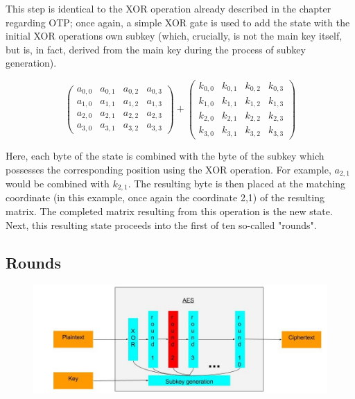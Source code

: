 \documentclass[12pt]{report}
\begin{document}
This step is identical to the XOR operation already described in the chapter regarding OTP; once again, a simple XOR gate is used to add the state with the initial XOR operations own subkey (which, crucially, is not the main key itself, but is, in fact, derived from the main key during the process of subkey generation).

\[ 
\left( \begin{array}{cccc}
a_{0,0} & a_{0,1} & a_{0,2} & a_{0,3} \\
a_{1,0} & a_{1,1} & a_{1,2} & a_{1,3} \\
a_{2,0} & a_{2,1} & a_{2,2} & a_{2,3} \\
a_{3,0} & a_{3,1} & a_{3,2} & a_{3,3}\end{array} \right)
+
\left( \begin{array}{cccc}
k_{0,0} & k_{0,1} & k_{0,2} & k_{0,3} \\
k_{1,0} & k_{1,1} & k_{1,2} & k_{1,3} \\
k_{2,0} & k_{2,1} & k_{2,2} & k_{2,3} \\
k_{3,0} & k_{3,1} & k_{3,2} & k_{3,3}\end{array} \right)
\]

Here, each byte of the state is combined with the byte of the subkey which possesses the corresponding position using the XOR operation. For example, $a_{2,1}$ would be combined with $k_{2,1}$. The resulting byte is then placed at the matching coordinate (in this example, once again the coordinate 2,1) of the resulting matrix. The completed matrix resulting from this operation is the new state. Next, this resulting state proceeds into the first of ten so-called "rounds".

\subsection{Rounds}

\begin{figure}[H]
\centering
\includegraphics[scale=0.4]{AES_fig3.jpg}
\end{figure}
\end{document}
